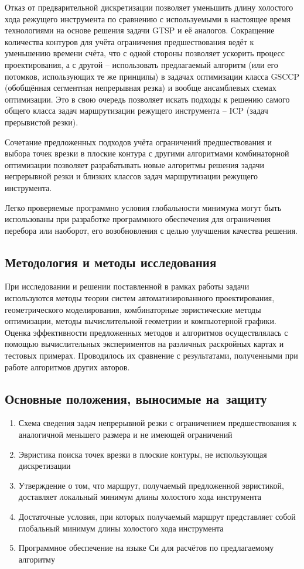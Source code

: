 \documentclass[14pt]{extarticle}
\theoremstyle{plain}%
\theoremstyle{remark}
\begin{document}
Отказ от предварительной дискретизации позволяет
уменьшить длину холостого хода
режущего инструмента
по сравнению с используемыми в настоящее
время технологиями на основе
решения задачи GTSP и её аналогов.
Сокращение количества контуров для
учёта ограничения предшествования
ведёт к уменьшению времени счёта,
что с одной стороны позволяет
ускорить процесс проектирования,
а с другой --
использовать предлагаемый алгоритм
(или его потомков, использующих
те же принципы)
в задачах оптимизации класса
GSCCP
(обобщённая сегментная непрерывная резка)
и вообще ансамблевых схемах оптимизации.
Это в свою очередь
позволяет искать подходы
к решению самого общего класса
задач маршрутизации режущего инструмента --
ICP
(задач прерывистой резки).

Сочетание предложенных подходов
учёта ограничений предшествования
и выбора точек врезки в плоские контура
с другими алгоритмами комбинаторной оптимизации
позволяет разрабатывать новые алгоритмы
решения задачи непрерывной резки
и близких классов задач маршрутизации
режущего инструмента.

Легко проверяемые программно
условия глобальности минимума
могут быть использованы
при разработке программного обеспечения
для ограничения перебора
или наоборот,
его возобновления с целью
улучшения качества решения.

\subsection*{Методология и методы исследования}

При исследовании и решении поставленной в рамках работы задачи
используются методы теории систем автоматизированного проектирования,
геометрического моделирования, комбинаторные эвристические методы
оптимизации, методы вычислительной геометрии и компьютерной графики.
Оценка эффективности предложенных
методов и алгоритмов осуществлялась с помощью вычислительных экспериментов
на различных раскройных картах и тестовых примерах.
Проводилось их сравнение с результатами,
полученными при работе алгоритмов
других авторов.

\subsection*{Основные положения, выносимые на~защиту}

\begin{enumerate}
  \item
  Схема сведения задач непрерывной резки
  с ограничением предшествования
  к аналогичной
  меньшего размера и
  не имеющей ограничений
  \item
  Эвристика поиска точек врезки в плоские контуры,
  не использующая дискретизации
  \item
  Утверждение о том,
  что маршрут,
  получаемый предложенной эвристикой,
  доставляет локальный минимум
  длины холостого хода инструмента
  \item
  Достаточные условия,
  при которых получаемый маршрут
  представляет собой глобальный
  минимум длины холостого хода инструмента
  \item
  Программное обеспечение на языке Си
  для расчётов по предлагаемому алгоритму
\end{enumerate}
\end{document}
